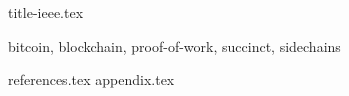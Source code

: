 \documentclass[conference,10pt,final,compsoc,letterpaper]{IEEEtran}
\begin{document}
{title-ieee.tex}

\begin{abstract}

\end{abstract}

\begin{IEEEkeywords}
bitcoin, blockchain, proof-of-work, succinct, sidechains
\end{IEEEkeywords}


\newpage
{references.tex}
\appendix
{appendix.tex}
\end{document}
